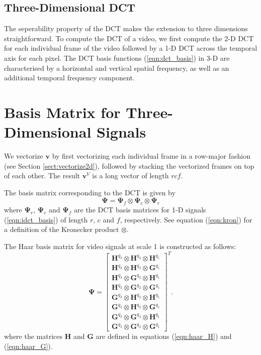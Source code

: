\subsection{Three-Dimensional DCT}
The seperability property of the DCT makes the extension to three dimensions straightforward.
To compute the DCT of a video, we first compute the 2-D DCT for each individual frame of the video followed by a 1-D DCT across the temporal axis for each pixel.
The DCT basis functions (\ref{eqn:dct_basis}) in 3-D are characterised by a horizontal and vertical spatial frequency, as well as an additional temporal frequency component.


\section{Basis Matrix for Three-Dimensional Signals}
We vectorize $\bm v$ by first vectorizing each individual frame in a row-major fashion (see Section \ref{sect:vectorize2d}), followed by stacking the vectorized frames on top of each other.
The result $\bm v^V$ is a long vector of length $rcf$.

The basis matrix corresponding to the DCT is given by 
\begin{equation*}
  \bm\Psi = \bm\Psi_f\otimes\bm\Psi_c\otimes\bm\Psi_r
\end{equation*}
where $\bm\Psi_r$, $\bm\Psi_c$ and $\bm\Psi_f$ are the DCT basis matrices for 1-D signals (\ref{eqn:idct_basis}) of length $r$, $c$ and $f$, respectively.
See equation (\ref{eqn:kron}) for a definition of the Kronecker product $\otimes$.

The Haar basis matrix for video signals at scale 1 is constructed as follows:
\begin{equation*}
  \bm\Psi = 
  \begin{bmatrix}
    \bm H^{q_3}\otimes \bm H^{q_2} \otimes\bm H^{q_1} \\
    \bm H^{q_3}\otimes \bm H^{q_2} \otimes \bm G^{q_1} \\
    \bm H^{q_3}\otimes \bm G^{q_2} \otimes \bm H^{q_1} \\
    \bm H^{q_3}\otimes \bm G^{q_2} \otimes \bm G^{q_1} \\
    \bm G^{q_3}\otimes \bm H^{q_2} \otimes\bm H^{q_1} \\
    \bm G^{q_3}\otimes \bm H^{q_2} \otimes \bm G^{q_1} \\
    \bm G^{q_3}\otimes \bm G^{q_2} \otimes \bm H^{q_1} \\
    \bm G^{q_3}\otimes \bm G^{q_2} \otimes \bm G^{q_1} 
  \end{bmatrix}^T.
\end{equation*}
where the matrices $\bm H$ and $\bm G$ are defined in equations (\ref{eqn:haar_H}) and (\ref{eqn:haar_G}).

